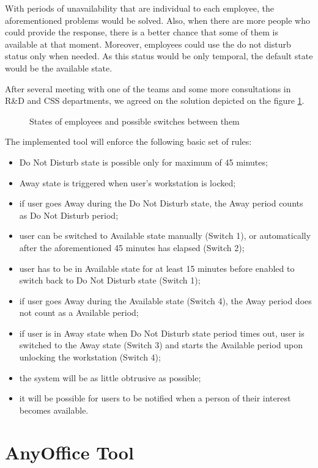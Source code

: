 \documentclass[11pt,singleside]{myfithesis2}
\newcommand{\pict}[4]{
	\begin{figure}[h!]
  		\vspace{-7px}
  		\centerline{\fcolorbox{darkgray}{palegray}{\texttt{[image: \#2]}}}
  		\caption{#1}
  		\label{#4}
	\end{figure}
}
\begin{document}
With periods of unavailability that are individual to each employee, the aforementioned problems would be solved. Also, when there are more people who could provide the response, there is a better chance that some of them is available at that moment. Moreover, employees could use the do not disturb status only when needed. As this status would be only temporal, the default state would be the available state.

After several meeting with one of the teams and some more consultations in R\&D and CSS departments, we agreed on the solution depicted on the figure \ref{pic:states}.

\pict{States of employees and possible switches between them}{data/States.png}{width=0.8\textwidth}{pic:states}

The implemented tool will enforce the following basic set of rules:
\begin{itemize}
	\item Do Not Disturb state is possible only for maximum of 45 minutes;
	\item Away state is triggered when user's workstation is locked;
	\item if user goes Away during the Do Not Disturb state, the Away period counts as Do Not Disturb period;
	\item user can be switched to Available state manually (Switch 1), or automatically after the aforementioned 45 minutes has elapsed (Switch 2);
	\item user has to be in Available state for at least 15 minutes before enabled to switch back to Do Not Disturb state (Switch 1);
	\item if user goes Away during the Available state (Switch 4), the Away period does not count as a Available period;
	\item if user is in Away state when Do Not Disturb state period times out, user is switched to the Away state (Switch 3) and starts the Available period upon unlocking the workstation (Switch 4);
	\item the system will be as little obtrusive as possible;
	\item it will be possible for users to be notified when a person of their interest becomes available.
\end{itemize}

\chapter{AnyOffice Tool}
\end{document}
